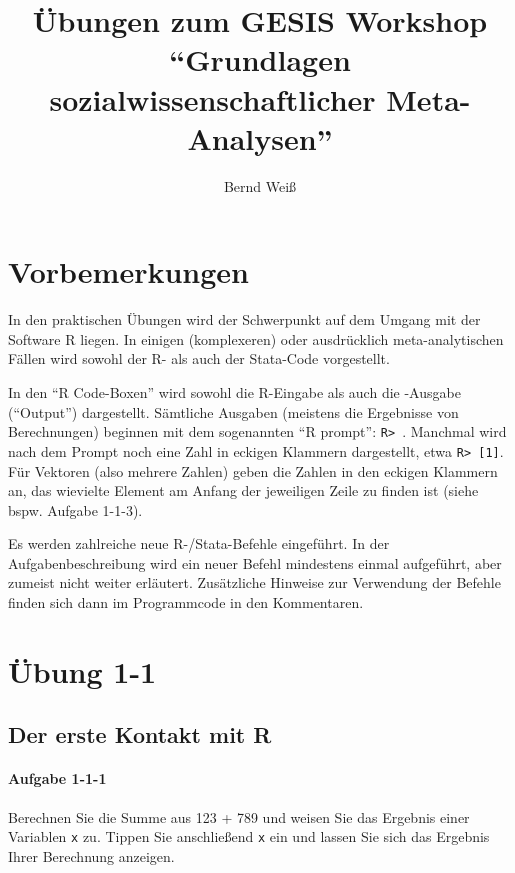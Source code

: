 \documentclass[normalheadings, 10pt]{scrartcl}\usepackage{graphicx, color}
\title{Übungen zum GESIS Workshop \enquote{Grundlagen sozialwissenschaftlicher Meta-Analysen}}
\author{Bernd Weiß}
\newcommand{\code}[1]{\texttt{#1}}
\begin{document}
\maketitle

\tableofcontents

\vspace{10ex}

\section*{Vorbemerkungen}

In den praktischen Übungen wird der Schwerpunkt auf dem Umgang mit der Software
R liegen. In einigen (komplexeren) oder ausdrücklich meta-analytischen Fällen wird sowohl der R- als auch der
Stata-Code vorgestellt.

In den "`R Code-Boxen"' wird sowohl die R-Eingabe als auch die -Ausgabe
("`Output"') dargestellt. Sämtliche Ausgaben (meistens die Ergebnisse von
Berechnungen) beginnen mit dem sogenannten "`R prompt"': \texttt{R> }. Manchmal
wird nach dem Prompt noch eine Zahl in eckigen Klammern dargestellt, etwa
\texttt{R> [1]}. Für Vektoren (also mehrere Zahlen) geben die Zahlen in den
eckigen Klammern an, das wievielte Element am Anfang der jeweiligen Zeile zu
finden ist (siehe bspw. Aufgabe 1-1-3).

Es werden zahlreiche neue R-/Stata-Befehle eingeführt. In der
Aufgabenbeschreibung wird ein neuer Befehl mindestens einmal aufgeführt, aber
zumeist nicht weiter erläutert. Zusätzliche Hinweise zur Verwendung der Befehle
finden sich dann im Programmcode in den Kommentaren.




\section{Übung 1-1}

\subsection{Der erste Kontakt mit R}


\paragraph{Aufgabe 1-1-1} Berechnen Sie die Summe aus 123 + 789 und weisen Sie das Ergebnis einer
  Variablen \code{x} zu. Tippen Sie anschließend \code{x} ein und lassen Sie
  sich das Ergebnis Ihrer Berechnung anzeigen.
\end{document}
